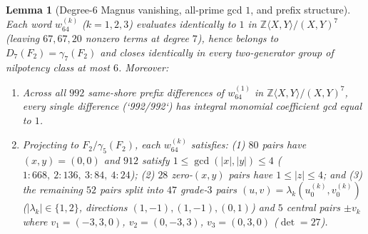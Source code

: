 \documentclass[11pt]{amsart}
\newtheorem{lemma}[theorem]{Lemma}
\theoremstyle{definition}
\theoremstyle{remark}
\newcommand{\Z}{\mathbb{Z}}
\begin{document}
\begin{lemma}[Degree-$6$ Magnus vanishing, all-prime gcd $1$, and prefix structure]\label{lem:c64_prefixes}
Each word $w_{64}^{(k)}$ ($k=1,2,3$) evaluates identically to $1$ in $\Z\langle X,Y\rangle/(X,Y)^7$ (leaving $67, 67, 20$ nonzero terms at degree $7$), hence belongs to $D_7(F_2) = \gamma_7(F_2)$ and closes identically in every two-generator group of nilpotency class at most $6$. Moreover:
\begin{enumerate}[label=(\alph*)]
\item Across all $992$ same-shore prefix differences of $w_{64}^{(1)}$ in $\Z\langle X,Y\rangle/(X,Y)^7$, \emph{every single difference} (`992/992`) has integral monomial coefficient gcd equal to $1$.
\item Projecting to $F_2/\gamma_5(F_2)$, each $w_{64}^{(k)}$ satisfies: (1) $80$ pairs have $(x,y) = (0,0)$ and $912$ satisfy $1 \le \gcd(|x|, |y|) \le 4$ ($1:668,\ 2:136,\ 3:84,\ 4:24$); (2) $28$ zero-$(x,y)$ pairs have $1 \le |z| \le 4$; and (3) the remaining $52$ pairs split into $47$ grade-$3$ pairs $(u,v) = \lambda_k (u_0^{(k)}, v_0^{(k)})$ ($|\lambda_k| \in \{1,2\}$, directions $(1,-1), (1,-1), (0,1)$) and $5$ central pairs $\pm v_k$ where $v_1 = (-3, 3, 0)$, $v_2 = (0, -3, 3)$, $v_3 = (0, 3, 0)$ ($\det = 27$).
\end{enumerate}
\end{lemma}
\end{document}
